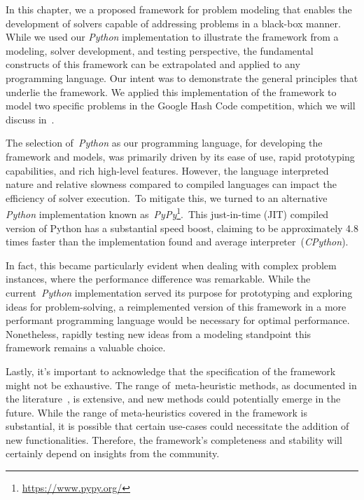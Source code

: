 In this chapter, we a proposed framework for problem modeling that enables the
development of solvers capable of addressing problems in a black-box manner.
While we used our \emph{Python} implementation to illustrate the framework from
a modeling, solver development, and testing perspective, the fundamental
constructs of this framework can be extrapolated and applied to any programming
language. Our intent was to demonstrate the general principles that underlie the
framework. We applied this implementation of the framework to model two specific
problems in the Google Hash Code competition, which we will discuss
in~.

The selection of~\emph{Python} as our programming language, for developing the
framework and models, was primarily driven by its ease of use, rapid prototyping
capabilities, and rich high-level features. However, the language interpreted
nature and relative slowness compared to compiled languages can impact the
efficiency of solver execution.~To mitigate this, we turned to an alternative
\emph{Python} implementation known as~\emph{PyPy}\footnote{\url{https://www.pypy.org/}}.~This just-in-time (JIT) compiled
version of Python has a substantial speed boost, claiming to be approximately
4.8 times faster than the implementation found and average interpreter~(\emph{CPython}).

In fact, this became particularly evident when dealing with complex problem
instances, where the performance difference was remarkable. While the
current~\emph{Python} implementation served its purpose for prototyping and
exploring ideas for problem-solving, a reimplemented version of this framework
in a more performant programming language would be necessary for optimal
performance. Nonetheless, rapidly testing new ideas from a modeling standpoint
this framework remains a valuable choice.

Lastly, it's important to acknowledge that the specification of the framework
might not be exhaustive. The range of~\acrshort{meta-heuristic} methods, as
documented in the literature~\cite{osman1996metaheuristics}, is extensive, and
new methods could potentially emerge in the future. While the range of
meta-heuristics covered in the framework is substantial, it is possible that
certain use-cases could necessitate the addition of new functionalities.
Therefore, the framework's completeness and stability will certainly depend on
insights from the community.
